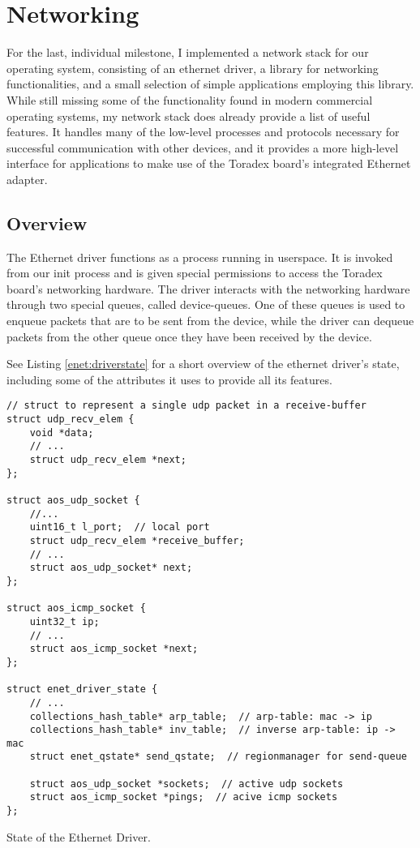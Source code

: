 \section{Networking}\label{networking}
For the last, individual milestone, I implemented a network stack for our operating system, consisting of an ethernet driver, a library for networking functionalities, and a small selection of simple applications employing this library. While still missing some of the functionality found in modern commercial operating systems, my network stack does already provide a list of useful features. It handles many of the low-level processes and protocols necessary for successful communication with other devices, and it provides a more high-level interface for applications to make use of the Toradex board's integrated Ethernet adapter.

\subsection{Overview}
The Ethernet driver functions as a process running in userspace. It is invoked from our init process and is given special permissions to access the Toradex board's networking hardware. The driver interacts with the networking hardware through two special queues, called device-queues. One of these queues is used to enqueue packets that are to be sent from the device, while the driver can dequeue packets from the other queue once they have been received by the device.

See Listing \ref{enet:driverstate} for a short overview of the ethernet driver's state, including some of the attributes it uses to provide all its features.

\begin{code}
\begin{mdframed}[style=myframe]
\begin{verbatim}
// struct to represent a single udp packet in a receive-buffer
struct udp_recv_elem {
    void *data;
    // ...
    struct udp_recv_elem *next;
};

struct aos_udp_socket {
    //...
    uint16_t l_port;  // local port
    struct udp_recv_elem *receive_buffer;
    // ...
    struct aos_udp_socket* next;
};

struct aos_icmp_socket {
    uint32_t ip;
    // ...
    struct aos_icmp_socket *next;
};

struct enet_driver_state {
    // ...
    collections_hash_table* arp_table;  // arp-table: mac -> ip
    collections_hash_table* inv_table;  // inverse arp-table: ip -> mac
    struct enet_qstate* send_qstate;  // regionmanager for send-queue

    struct aos_udp_socket *sockets;  // active udp sockets
    struct aos_icmp_socket *pings;  // acive icmp sockets
};
\end{verbatim}
\end{mdframed}
\caption{State of the Ethernet Driver.}
\end{code}
\label{enet:driverstate}

